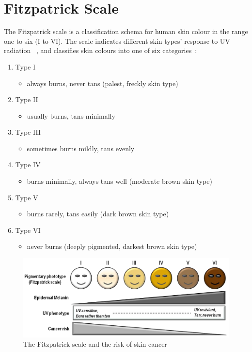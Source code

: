 \documentclass[12pt,openany,a4paper]{book}
\newcommand{\fig}[1]  {Fig.\,\ref{#1}}		%
\begin{document}
\section{Fitzpatrick Scale}
\label{secn:fitzpatrick_scale}

The Fitzpatrick scale is a classification schema for human skin colour in the
range one to six (I to VI). The scale indicates different skin types' response to UV
radiation ~\cite[\fig{fig:fitzpatrick_scale}]{dorazio_2013}, and classifies skin
colours into one of six categories~\cite{skin_inc}:
\begin{enumerate}
	\item Type I
	\begin{itemize}
		\item always burns, never tans (palest, freckly skin type)
	\end{itemize}
	\item Type II
	\begin{itemize}
		\item usually burns, tans minimally
	\end{itemize}
	\item Type III
	\begin{itemize}
		\item sometimes burns mildly, tans evenly
	\end{itemize}
	\item Type IV
	\begin{itemize}
		\item burns minimally, always tans well (moderate brown skin type)
	\end{itemize}
	\item Type V
	\begin{itemize}
		\item burns rarely, tans easily (dark brown skin type)
	\end{itemize}
	\item Type VI
	\begin{itemize}
		\item never burns (deeply pigmented, darkest brown skin type)
	\end{itemize}
\end{enumerate}

\begin{figure}[h]
\centerline{\includegraphics[width=\textwidth]{FitzpatrickScale.png}}
\caption{The Fitzpatrick scale and the risk of skin cancer}
\label{fig:fitzpatrick_scale}
\end{figure}
\end{document}
